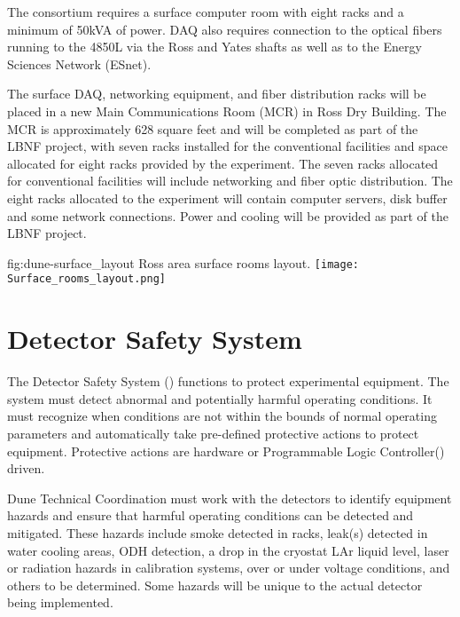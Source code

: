 The  consortium requires a surface computer room with eight
racks and a minimum of 50kVA of power.  DAQ also requires connection
to the optical fibers running to the 4850L via the Ross and Yates shafts as well as to the Energy Sciences Network (ESnet).

The surface DAQ, networking equipment, and fiber distribution racks will be placed in a new Main Communications Room (MCR) in Ross Dry Building.  The MCR is approximately 628 square feet and will be completed as part of the LBNF project, with seven racks installed for the conventional facilities and space allocated for eight racks provided by the experiment.  The seven racks allocated for conventional facilities will include networking and fiber optic distribution.  The eight racks allocated to the experiment will contain computer servers, disk buffer and some network connections.  Power and cooling will be provided as part of the LBNF project.

\begin{dunefigure}{fig:dune-surface_layout}
  {Ross area surface rooms layout.}
  \texttt{[image: Surface\_rooms\_layout.png]}
\end{dunefigure}




\section{ Detector Safety System}
\label{sec:fdsp-coord-det-safety}


The  Detector Safety System () functions to protect experimental equipment.  The system must detect abnormal and potentially harmful operating conditions.  It must recognize when conditions are not within the bounds of normal operating parameters and automatically take pre-defined protective actions to protect equipment.  Protective actions are hardware or Programmable Logic Controller() driven.  

Dune Technical Coordination must work with the detectors to identify equipment hazards and ensure that harmful operating conditions can be detected and mitigated.  These hazards include smoke detected in racks, leak(s) detected in water cooling areas, ODH detection, a drop in the cryostat LAr liquid level, laser or radiation hazards in calibration systems, over or under voltage conditions, and others to be determined.  Some hazards will be unique to the actual detector being implemented. 


